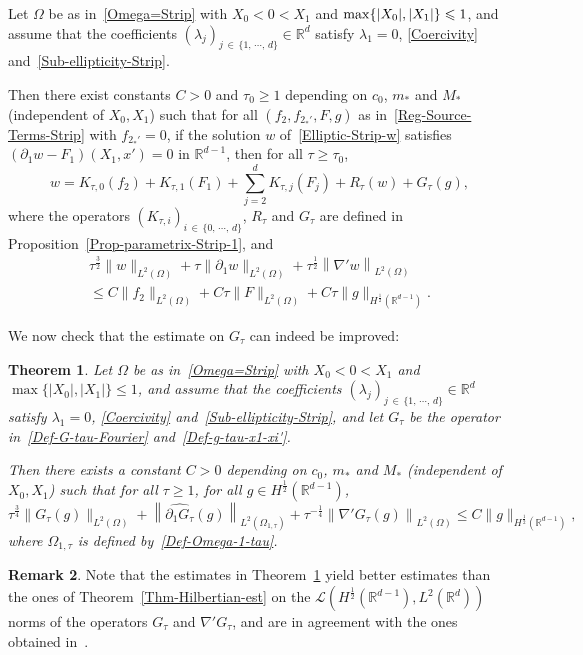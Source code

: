 \documentclass[10pt]{amsart}
\newtheorem{theo}{Theorem}[section]
\theoremstyle{definition}\newtheorem{defi}[theo]{Definition}\newtheorem{rema}[theo]{Remark}\newtheorem{exam}[theo]{Example}\newtheorem{exem}[theo]{Example}\newtheorem{nota}[theo]{Notation}
\newcommand{\scL}{\mathscr{L}}
\newcommand*\R{\mathbb{R}}
\renewcommand{\leq}{\leqslant}
\renewcommand{\geq}{\geqslant}
\begin{document}
\begin{prop}\label{Prop-parametrix-Strip-2}
Let $\Omega$ be as in~\eqref{Omega=Strip} with $X_0 \! <\! 0\! <\! X_1$ and $\max\{|X_0|, |X_1|\}\linebreak \leq 1$, and assume that the coefficients $(\lambda_j)_{j\, \in\,\{1,\,\cdots,\,d\}} \in \R^d$ satisfy $\lambda_1 = 0$, \eqref{Coercivity} and~\eqref{Sub-ellipticity-Strip}.

Then there exist constants $C>0$ and $\tau_0 \geq 1$ depending on $c_0$, $m_*$ and $M_*$ (independent of $X_0, X_1$) such that for all $(f_2, f_{2_*'},F,g)$ as in~\eqref{Reg-Source-Terms-Strip} with $f_{2_*'} = 0$, if the solution $w$ of~\eqref{Elliptic-Strip-w} satisfies $(\partial_1 w - F_1)(X_1,x') = 0$ in $\R^{d-1}$, then for all $\tau \geq \tau_0$,
\begin{equation*}
w = K_{\tau,0} (f_2) + K_{\tau,1}(F_1) + \sum_{j = 2}^d K_{\tau,j}(F_j) + R_\tau (w) + G_\tau(g),
\end{equation*}
where the operators $(K_{\tau,i})_{i\, \in\,\{0,\,\cdots,\,d\}}$, $R_\tau$ and $G_\tau$ are defined in Proposition~\ref{Prop-parametrix-Strip-1}, and
\begin{multline*}
\tau^{\frac{3}{2}} \| w \|_{L^2(\Omega)} + \tau \| \partial_1 w \|_{L^2(\Omega)} + \tau^{\frac{1}{2}} \left\| \nabla' w \right\|_{L^2(\Omega)}\\
\leq  C \| f_2 \|_{L^2(\Omega)} + C \tau \| F\|_{L^2(\Omega)} + C \tau \| g \|_{H^{\frac{1}{2}}\left(\R^{d-1}\right)}.
\end{multline*}
\end{prop}


We now check that the estimate on $G_{\tau}$ can indeed be improved:
\begin{theo}\label{Thm-Improved-Hilbert-Est-G-tau}
Let $\Omega$ be as in~\eqref{Omega=Strip} with $X_0 \! <\! 0\! <\! X_1$ and $\max\{|X_0|, |X_1|\} \leq 1$, and assume that the coefficients $(\lambda_j)_{j\,\in\,\{1,\,\cdots,\,d\}} \in \R^d$ satisfy $\lambda_1 = 0$, \eqref{Coercivity} and~\eqref{Sub-ellipticity-Strip}, and let $G_\tau$ be the operator in~\eqref{Def-G-tau-Fourier} and~\eqref{Def-g-tau-x1-xi'}.

Then there exists a constant $C>0$ depending on $c_0$, $m_*$ and $M_*$ (independent of $X_0, X_1$) such that for all $\tau \geq 1$, for all $g \in H^{\frac{1}{2}}(\R^{d-1})$,
\begin{equation*}
\tau^{\frac{3}{4}} \| G_{\tau} (g) \|_{L^2(\Omega)} +
\left\| \widehat{\partial_1 G_\tau} (g) \right\|_{L^2(\Omega_{1, \tau})} +
\tau^{-\frac{1}{4}} \left\| \nabla' G_\tau (g) \right\|_{L^2(\Omega)}
\leq C \| g \|_{H^{\frac{1}{2}}\left(\R^{d-1}\right)},
\end{equation*}
where $\Omega_{1, \tau}$ is defined by~\eqref{Def-Omega-1-tau}.
\end{theo}
\begin{rema}
Note that the estimates in Theorem~\ref{Thm-Improved-Hilbert-Est-G-tau} yield better estimates than the ones of Theorem~\ref{Thm-Hilbertian-est} on the $\scL(H^{\frac{1}{2}}(\R^{d-1}), L^2(\R^d))$ norms of the operators $G_\tau$ and $\nabla' G_{\tau}$, and are in agreement with the ones obtained in~\cite{imanuvilov2003global}.
\end{rema}
\end{document}
